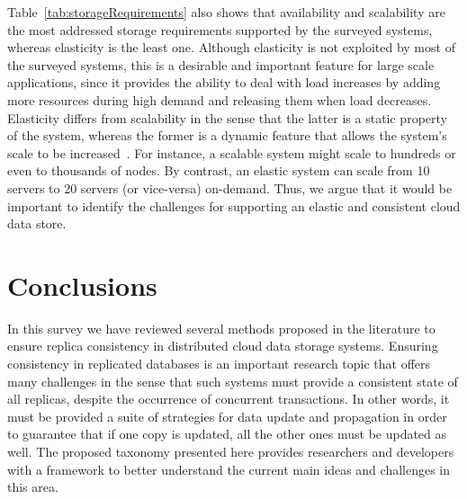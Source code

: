 {\rc Table~\ref{tab:storageRequirements} also shows that availability and scalability are the most addressed storage requirements supported by the surveyed systems, whereas elasticity is the least one.} Although elasticity is not exploited by most of the surveyed systems, this is a desirable and important feature for large scale applications, 
since it provides the ability to deal with load increases by adding more resources during high demand and releasing them when load decreases. Elasticity differs from scalability in the sense that the latter is a static property of the system, whereas the former is a dynamic feature that allows the system’s scale to be increased~\cite{agrawal2011database}. For instance, a scalable system might scale to hundreds or even to thousands of nodes. By contrast, an elastic system can scale from 10 servers to 20 servers (or vice-versa) on-demand.
Thus, we argue that it would be important to identify the challenges for supporting an elastic and consistent cloud data store.

\section{Conclusions}
\label{sec:conclusions}

In this survey we have reviewed several methods 
proposed in the literature to ensure replica consistency in distributed cloud data storage systems. 
Ensuring consistency in replicated databases is an important research topic that offers many challenges in the sense that such systems must provide a consistent state of all replicas, despite the occurrence of concurrent transactions. In other words, it must be provided a suite of strategies for data update and propagation in order to guarantee that if one copy is updated, all the other ones must be updated as well. 
The proposed taxonomy presented 
here provides researchers and developers with a framework to better understand the current main ideas and challenges in this area.

